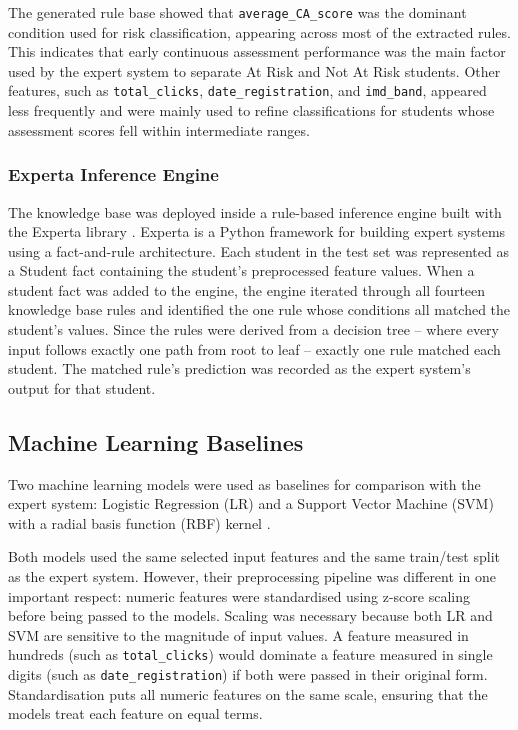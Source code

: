 The generated rule base showed that \texttt{average\_CA\_score} was the dominant condition used for risk classification, appearing across most of the extracted rules. This indicates that early continuous assessment performance was the main factor used by the expert system to separate At Risk and Not At Risk students. Other features, such as \texttt{total\_clicks}, \texttt{date\_registration}, and \texttt{imd\_band}, appeared less frequently and were mainly used to refine classifications for students whose assessment scores fell within intermediate ranges.

\subsubsection{Experta Inference Engine}

The knowledge base was deployed inside a rule-based inference engine built with the Experta library \parencite{experta2015}. Experta is a Python framework for building expert systems using a fact-and-rule architecture. Each student in the test set was represented as a Student fact containing the student's preprocessed feature values. When a student fact was added to the engine, the engine iterated through all fourteen knowledge base rules and identified the one rule whose conditions all matched the student's values. Since the rules were derived from a decision tree -- where every input follows exactly one path from root to leaf -- exactly one rule matched each student. The matched rule's prediction was recorded as the expert system's output for that student.

\subsection{Machine Learning Baselines}

Two machine learning models were used as baselines for comparison with the expert system: Logistic Regression (LR) and a Support Vector Machine (SVM) with a radial basis function (RBF) kernel \parencite{cortes1995support}.

Both models used the same selected input features and the same train/test split as the expert system. However, their preprocessing pipeline was different in one important respect: numeric features were standardised using z-score scaling before being passed to the models. Scaling was necessary because both LR and SVM are sensitive to the magnitude of input values. A feature measured in hundreds (such as \texttt{total\_clicks}) would dominate a feature measured in single digits (such as \texttt{date\_registration}) if both were passed in their original form. Standardisation puts all numeric features on the same scale, ensuring that the models treat each feature on equal terms.

